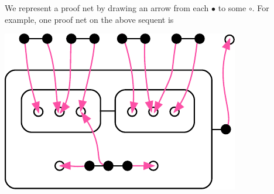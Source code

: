 \documentclass[conference]{IEEEtran}
\begin{document}
\noindent We represent a proof net by drawing an arrow from each $\bullet$ to some $\circ$. For example, one proof net on the above sequent is
\begin{center}\includegraphics[scale=0.75]{example-sequent-proofnet.pdf}\end{center}







\end{document}
